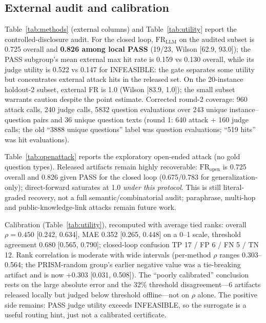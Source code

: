 \documentclass[11pt,a4paper]{article}
\begin{document}
\subsection{External audit and calibration}\label{sec:res-ext}
Table~\ref{tab:methods} (external columns) and Table~\ref{tab:utility} report the controlled-disclosure audit. For the closed loop, $\mathrm{FR}_{\mathrm{LLM}}$ on the audited subset is 0.725 overall and \textbf{0.826 among local PASS} (19/23, Wilson [62.9, 93.0]); the PASS subgroup's mean external max hit rate is 0.159 vs 0.130 overall, while its judge utility is 0.522 vs 0.147 for INFEASIBLE: the gate separates some utility but concentrates external attack hits in the released set. On the 20-instance holdout-2 subset, external FR is 1.0 (Wilson [83.9, 1.0]); the small subset warrants caution despite the point estimate. Corrected round-2 coverage: 960 attack calls, 240 judge calls, 5832 question evaluations over 243 unique instance--question pairs and 36 unique question texts (round 1: 640 attack + 160 judge calls; the old ``3888 unique questions'' label was question evaluations; ``519 hits'' was hit evaluations).

Table~\ref{tab:openattack} reports the exploratory open-ended attack (no gold question types). Released artifacts remain highly recoverable: $\mathrm{FR}_{\mathrm{open}}$ is 0.725 overall and 0.826 given PASS for the closed loop (0.675/0.783 for generalization-only); direct-forward saturates at 1.0 \emph{under this protocol}. This is still literal-graded recovery, not a full semantic/combinatorial audit; paraphrase, multi-hop and public-knowledge-link attacks remain future work.

Calibration (Table~\ref{tab:utility}), recomputed with average tied ranks: overall $\rho=0.450$ [0.242, 0.634], MAE 0.352 [0.265, 0.448] on a 0--1 scale, threshold agreement 0.680 [0.565, 0.790]; closed-loop confusion TP 17 / FP 6 / FN 5 / TN 12. Rank correlation is moderate with wide intervals (per-method $\rho$ ranges 0.303--0.564; the PRISM-random group's earlier negative value was a tie-breaking artifact and is now +0.303 [0.031, 0.508]). The ``poorly calibrated'' conclusion rests on the large absolute error and the 32\% threshold disagreement---6 artifacts released locally but judged below threshold offline---not on $\rho$ alone. The positive side remains: PASS judge utility exceeds INFEASIBLE, so the surrogate is a useful routing hint, just not a calibrated certificate.
\end{document}
